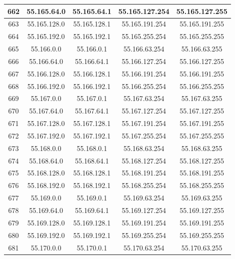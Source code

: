 \documentclass[letterpaper,12pt]{article}
\begin{document}
\begin{center}
\begin{longtable}{|c|c|c|c|c|}
                662 & 55.165.64.0 & 55.165.64.1 & 55.165.127.254 & 55.165.127.255 \\ \hline
                663 & 55.165.128.0 & 55.165.128.1 & 55.165.191.254 & 55.165.191.255 \\ \hline
                664 & 55.165.192.0 & 55.165.192.1 & 55.165.255.254 & 55.165.255.255 \\ \hline
                665 & 55.166.0.0 & 55.166.0.1 & 55.166.63.254 & 55.166.63.255 \\ \hline
                666 & 55.166.64.0 & 55.166.64.1 & 55.166.127.254 & 55.166.127.255 \\ \hline
                667 & 55.166.128.0 & 55.166.128.1 & 55.166.191.254 & 55.166.191.255 \\ \hline
                668 & 55.166.192.0 & 55.166.192.1 & 55.166.255.254 & 55.166.255.255 \\ \hline
                669 & 55.167.0.0 & 55.167.0.1 & 55.167.63.254 & 55.167.63.255 \\ \hline
                670 & 55.167.64.0 & 55.167.64.1 & 55.167.127.254 & 55.167.127.255 \\ \hline
                671 & 55.167.128.0 & 55.167.128.1 & 55.167.191.254 & 55.167.191.255 \\ \hline
                672 & 55.167.192.0 & 55.167.192.1 & 55.167.255.254 & 55.167.255.255 \\ \hline
                673 & 55.168.0.0 & 55.168.0.1 & 55.168.63.254 & 55.168.63.255 \\ \hline
                674 & 55.168.64.0 & 55.168.64.1 & 55.168.127.254 & 55.168.127.255 \\ \hline
                675 & 55.168.128.0 & 55.168.128.1 & 55.168.191.254 & 55.168.191.255 \\ \hline
                676 & 55.168.192.0 & 55.168.192.1 & 55.168.255.254 & 55.168.255.255 \\ \hline
                677 & 55.169.0.0 & 55.169.0.1 & 55.169.63.254 & 55.169.63.255 \\ \hline
                678 & 55.169.64.0 & 55.169.64.1 & 55.169.127.254 & 55.169.127.255 \\ \hline
                679 & 55.169.128.0 & 55.169.128.1 & 55.169.191.254 & 55.169.191.255 \\ \hline
                680 & 55.169.192.0 & 55.169.192.1 & 55.169.255.254 & 55.169.255.255 \\ \hline
                681 & 55.170.0.0 & 55.170.0.1 & 55.170.63.254 & 55.170.63.255 \\ \hline

\end{longtable}
\end{center}
\end{document}
